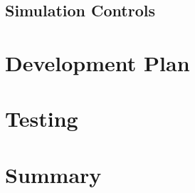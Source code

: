 \documentclass[11pt]{article} %
\begin{document}
\subsection{Simulation Controls}
\section{Development Plan}


\section{Testing}


\section{Summary}

\end{document}
